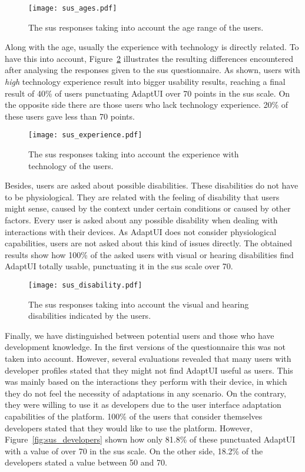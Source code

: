 \begin{figure}
\centering
\texttt{[image: sus\_ages.pdf]}
\caption{The \ac{sus} responses taking into account the age range of the users.}
\label{fig:sus_age}
\end{figure}

Along with the age, usually the experience with technology is directly related.
To have this into account, Figure~\ref{fig:sus_experience} illustrates the
resulting differences encountered after analysing the responses given to the \ac{sus}
questionnaire. As shown, users with \textit{high} technology experience 
result into bigger usability results, reaching a final result of 40\% of 
users punctuating AdaptUI over 70 points in the \ac{sus} scale. On the opposite side 
there are those users who lack technology experience. 20\% of these 
users gave less than 70 points. 

\begin{figure}
\centering
\texttt{[image: sus\_experience.pdf]}
\caption{The \ac{sus} responses taking into account the experience with technology
of the users.}
\label{fig:sus_experience}
\end{figure}

Besides, users are asked about possible disabilities. These disabilities do not
have to be physiological. They are related with the feeling of disability that
users might sense, caused by the context under certain conditions or caused by
other factors. Every user is asked about any possible disability when dealing
with interactions with their devices. As AdaptUI does not consider physiological
capabilities, users are not asked about this kind of issues directly. The
obtained results show how 100\% of the asked users with visual or hearing
disabilities find AdaptUI totally usable, punctuating it in the \ac{sus} scale over
70.

\begin{figure}
\centering
\texttt{[image: sus\_disability.pdf]}
\caption{The \ac{sus} responses taking into account the visual and hearing 
disabilities indicated by the users.}
\label{fig:sus_disability}
\end{figure}

Finally, we have distinguished between potential users and those who have
development knowledge. In the first versions of the questionnaire this was not
taken into account. However, several evaluations revealed that many users with 
developer profiles stated that they might not find AdaptUI useful as users. This
was mainly based on the interactions they perform with their device, in which they
do not feel the necessity of adaptations in any scenario. On the contrary, they 
were willing to use it as developers due to the user 
interface adaptation capabilities of the platform. 100\% of the users that 
consider themselves developers stated that they would like to use the platform. 
However, Figure~\ref{fig:sus_developers} shown how only 81.8\% of these 
punctuated AdaptUI with a value of over 70 in the \ac{sus} scale. On the other 
side, 18.2\% of the developers stated a value between 50 and 70.

